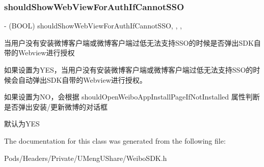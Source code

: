 \subsubsection{\texorpdfstring{should\+Show\+Web\+View\+For\+Auth\+If\+Cannot\+S\+SO}{shouldShowWebViewForAuthIfCannotSSO}}
{\footnotesize\ttfamily -\/ (B\+O\+OL) should\+Show\+Web\+View\+For\+Auth\+If\+Cannot\+S\+SO\hspace{0.3cm}{\ttfamily [read]}, {\ttfamily [write]}, {\ttfamily [nonatomic]}, {\ttfamily [assign]}}

当用户没有安装微博客户端或微博客户端过低无法支持\+S\+S\+O的时候是否弹出\+S\+D\+K自带的\+Webview进行授权

如果设置为\+Y\+E\+S，当用户没有安装微博客户端或微博客户端过低无法支持\+S\+S\+O的时候会自动弹出\+S\+D\+K自带的\+Webview进行授权。

如果设置为\+N\+O，会根据 should\+Open\+Weibo\+App\+Install\+Page\+If\+Not\+Installed 属性判断是否弹出安装/更新微博的对话框

默认为\+Y\+ES 

The documentation for this class was generated from the following file\+:\begin{DoxyCompactItemize}
\item 
Pods/\+Headers/\+Private/\+U\+Meng\+U\+Share/Weibo\+S\+D\+K.\+h\end{DoxyCompactItemize}
